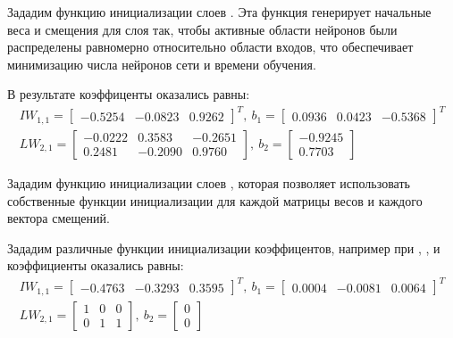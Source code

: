 

Зададим функцию инициализации слоев . Эта функция генерирует начальные веса и смещения для слоя так, чтобы активные области нейронов были распределены равномерно относительно области входов, что обеспечивает минимизацию числа нейронов сети и времени обучения.



В результате коэффиценты оказались равны:
\begin{gather*}
IW_{1,1} = \begin{bmatrix} -0.5254 & -0.0823 & 0.9262 \end{bmatrix}^T,\
b_1 = \begin{bmatrix} 0.0936 & 0.0423 & -0.5368 \end{bmatrix}^T \\
LW_{2,1} = \begin{bmatrix} -0.0222 & 0.3583 & -0.2651 \\ 0.2481 & -0.2090 & 0.9760 \end{bmatrix},\ 
b_2 = \begin{bmatrix} -0.9245 \\ 0.7703 \end{bmatrix}
\end{gather*}

Зададим функцию инициализации слоев , которая позволяет использовать собственные функции инициализации для каждой матрицы весов и каждого вектора смещений. 



Зададим различные функции инициализации коэффицентов, например при , ,  и  коэффициенты оказались равны:
\begin{gather*}
IW_{1,1} = \begin{bmatrix} -0.4763 & -0.3293 & 0.3595 \end{bmatrix}^T,\
b_1 = \begin{bmatrix} 0.0004 & -0.0081 & 0.0064 \end{bmatrix}^T \\
LW_{2,1} = \begin{bmatrix} 1 & 0 & 0 \\ 0 & 1 & 1 \end{bmatrix},\ 
b_2 = \begin{bmatrix} 0 \\ 0 \end{bmatrix}
\end{gather*}


